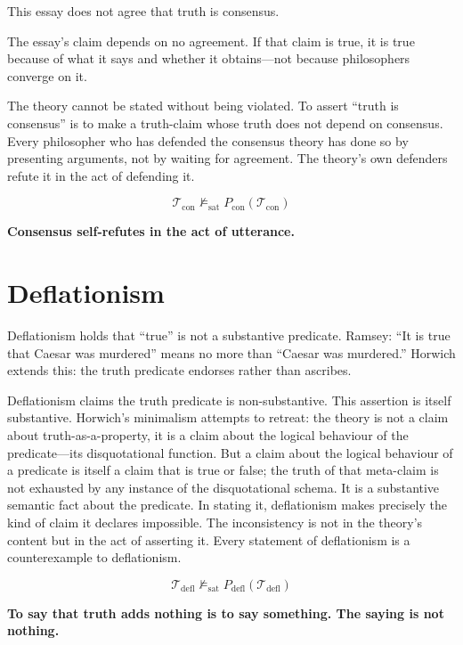 \documentclass[11pt, oneside]{article}
\newcommand{\verdict}[1]{%
    \vspace{10pt}%
    \begin{center}\textcolor{LogosGold}{\textbf{#1}}\end{center}%
    \vspace{10pt}%
}
\begin{document}
This essay does not agree that truth is consensus.

The essay's claim depends on no agreement. If that claim is true, it is
true because of what it says and whether it obtains---not because
philosophers converge on it.

The theory cannot be stated without being violated. To assert ``truth is
consensus'' is to make a truth-claim whose truth does not depend on
consensus. Every philosopher who has defended the consensus theory has
done so by presenting arguments, not by waiting for agreement. The
theory's own defenders refute it in the act of defending it.

\[
\mathcal{T}_{\mathrm{con}} \not\models_{\mathrm{sat}}
P_{\mathrm{con}}(\mathcal{T}_{\mathrm{con}}) \tag{AC}
\]

\verdict{Consensus self-refutes in the act of utterance.}

\section{Deflationism}

Deflationism holds that ``true'' is not a substantive predicate. Ramsey:
``It is true that Caesar was murdered'' means no more than ``Caesar was
murdered.'' Horwich extends this: the truth predicate endorses rather
than ascribes.

Deflationism claims the truth predicate is non-substantive. This
assertion is itself substantive. Horwich's minimalism attempts to retreat: the theory is not a
claim about truth-as-a-property, it is a claim about the logical
behaviour of the predicate---its disquotational function. But a claim
about the logical behaviour of a predicate is itself a claim that is
true or false; the truth of that meta-claim is not exhausted by any
instance of the disquotational schema. It is a substantive semantic fact
about the predicate. In stating it, deflationism makes precisely the
kind of claim it declares impossible. The inconsistency is not in the theory's
content but in the act of asserting it. Every statement of deflationism
is a counterexample to deflationism.

\[
\mathcal{T}_{\mathrm{defl}} \not\models_{\mathrm{sat}}
P_{\mathrm{defl}}(\mathcal{T}_{\mathrm{defl}}) \tag{AC}
\]

\verdict{To say that truth adds nothing is to say something. The saying is not nothing.}
\end{document}
